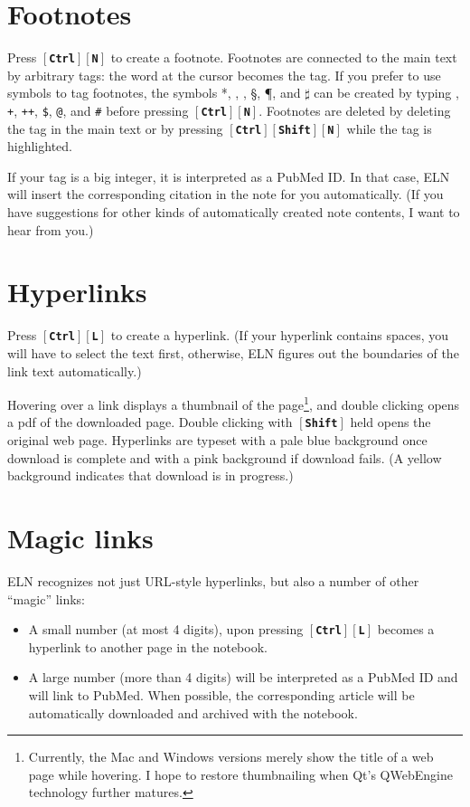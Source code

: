 \documentclass[11pt]{report}
\def\keystroke#1{$\left[\right.\!${\tt\bfseries #1}$\!\left.\right]$}
\def\key#1{\keystroke{#1}}
\def\keycombo#1#2{\keystroke{#1}\keystroke{#2}}
\def\keycontrol#1{\keycombo{Ctrl}{#1}}
\def\controlshift#1{\keystroke{Ctrl}\keystroke{Shift}\keystroke{#1}}
\begin{document}
\section{Footnotes}

Press \keycontrol{N} to create a footnote. Footnotes are connected to
the main text by arbitrary tags: the word at the cursor becomes the
tag.  If you prefer to use symbols to tag footnotes, the symbols *,
\dag, \ddag, \S, \P, and $\sharp$ can be created by typing {\tt *},
    {\tt +}, {\tt ++}, {\tt\$}, {\tt @}, and {\tt \#} before pressing
    \keycontrol{N}. Footnotes are deleted by deleting the tag in the
    main text or by pressing \controlshift{N} while the tag is
    highlighted.

If your tag is a big integer, it is interpreted as a PubMed ID. In
that case, ELN will insert the corresponding citation in the note for
you automatically. (If you have suggestions for other kinds of
automatically created note contents, I want to hear from you.)

\section{Hyperlinks}

Press \keycontrol{L} to create a hyperlink. (If your hyperlink
contains spaces, you will have to select the text first, otherwise,
ELN figures out the boundaries of the link text automatically.)

Hovering over a link displays a thumbnail of the
page\footnote{Currently, the Mac and Windows versions merely show the
  title of a web page while hovering. I hope to restore thumbnailing
  when Qt's QWebEngine technology further matures.}, and double
clicking opens a pdf of the downloaded page. Double clicking with
\key{Shift} held opens the original web page. Hyperlinks are typeset
with a pale blue background once download is complete and with a pink
background if download fails. (A yellow background indicates that
download is in progress.)

\section{Magic links}

ELN recognizes not just URL-style hyperlinks, but also a number of
other ``magic'' links:
\begin{itemize}
\item A small number (at most 4 digits), upon pressing \keycontrol{L}
becomes a hyperlink to another page in the notebook.
\item A large number (more than 4 digits)
will be interpreted as a PubMed ID and will link to PubMed. When
possible, the corresponding article will be automatically downloaded
and archived with the notebook. 
\end{itemize}
\end{document}
